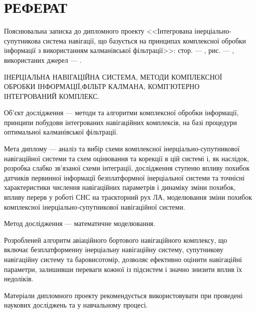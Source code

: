 % 
% 

\section*{РЕФЕРАТ}
Пояснювальна записка до дипломного проекту <<Інтегрована інерціально-супутникова система навігації, що базується на принципах комплексної обробки інформації з використанням калманівської фільтрації>>: стор. ---   , рис. --- , використаних джерел --- .



ІНЕРЦІАЛЬНА НАВІГАЦІЙНА СИСТЕМА, МЕТОДИ КОМПЛЕКСНОЇ ОБРОБКИ ІНФОРМАЦІЇ,ФІЛЬТР КАЛМАНА, КОМП’ЮТЕРНО ІНТЕГРОВАНИЙ КОМПЛЕКС.

Об’єкт дослідження --- методи та алгоритми комплексної обробки інформації, принципи побудови інтегрованих навігаційних комплексів, на базі процедури
оптимальної калманівської фільтрації.

Мета диплому --- аналіз та вибір схеми комплексної інерціально-супутникової навігаційної системи та схем оцінювання та корекції в цій системі і, як наслідок, розробка слабко зв’язаної схеми інтеграції, дослідження ступеню впливу похибок датчиків первинної інформації  безплатформної інерціальної системи та точнісні характеристики числення навігаційних параметрів і динаміку зміни похибок, впливу перерв у роботі СНС на траєкторний рух ЛА, моделювання зміни похибок комплексної інерціально-супутникової навігаційної системи.

Метод дослідження --- математичне моделювання.

Розробленей алгоритм авіаційного бортового навігаційного комплексу, що включає безплатформенну інерціальну навігаційну систему, супутникову навігаційну систему та баровисотомір, дозволяє ефективно оцінити навігаційні параметри, залишивши переваги кожної із підсистем і значно знизити вплив їх недоліків.

Матеріали дипломного проекту рекомендується використовувати при проведені наукових досліджень та у навчальному процесі.

%
